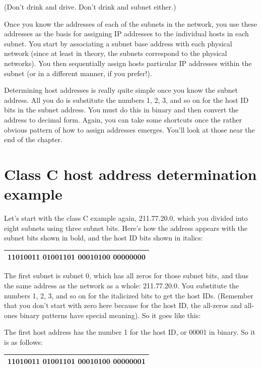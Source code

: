 (Don't drink and drive. Don't drink and subnet either.)

 

Once you know the addresses of each of the subnets in the network, you
use these addresses as the basis for assigning IP addresses to the
individual hosts in each subnet. You start by associating a subnet base
address with each physical network (since at least in theory, the
subnets correspond to the physical networks). You then sequentially
assign hosts particular IP addresses within the subnet (or in a
different manner, if you prefer!).

Determining host addresses is really quite simple once you know the
subnet address. All you do is substitute the numbers 1, 2, 3, and so on
for the host ID bits in the subnet address. You must do this in binary
and then convert the address to decimal form. Again, you can take some
shortcuts once the rather obvious pattern of how to assign addresses
emerges. You'll look at those near the end of the chapter.




\section{Class C host address determination example}

Let's start with the class C example again, 211.77.20.0, which you
divided into eight subnets using three subnet bits. Here's how the
address appears with the subnet bits shown in bold, and the host ID bits
shown in italics:

\begin{longtable}[]{@{}l@{}}
\toprule
\endhead
11010011 01001101 00010100 {\textbf{000}}{00000}\tabularnewline
\bottomrule
\end{longtable}

The first subnet is subnet 0, which has all zeros for those subnet bits,
and thus the same address as the network as a whole: 211.77.20.0. You
substitute the numbers 1, 2, 3, and so on for the italicized bits to get
the host IDs. (Remember that you don't start with zero here because for
the host ID, the all-zeros and all-ones binary patterns have special
meaning). So it goes like this:

The first host address has the number 1 for the host ID, or 00001 in
binary. So it is as follows:

\begin{longtable}[]{@{}l@{}}
\toprule
\endhead
11010011 01001101 00010100 {\textbf{000}}{00001}\tabularnewline
\bottomrule
\end{longtable}

